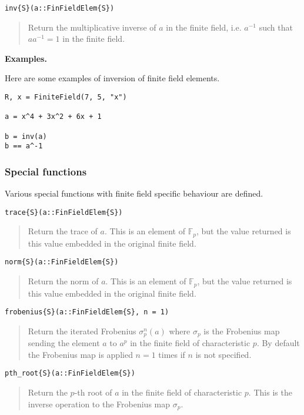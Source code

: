 \documentclass[a4paper,10pt]{article}
\newcommand{\F}{\mathbb{F}}
\newcommand{\desc}[1]{\vspace{-3mm}\begin{quote}#1\end{quote}}
\begin{document}
{{\begin{lstlisting}
inv{S}(a::FinFieldElem{S})
\end{lstlisting}

\desc{Return the multiplicative inverse of $a$ in the finite field, i.e. 
$a^{-1}$ such that $aa^{-1} = 1$ in the finite field.}

\textbf{Examples.}

Here are some examples of inversion of finite field elements.

\begin{lstlisting}
R, x = FiniteField(7, 5, "x")

a = x^4 + 3x^2 + 6x + 1

b = inv(a)
b == a^-1
\end{lstlisting}

\subsubsection{Special functions}

Various special functions with finite field specific behaviour are
defined.

\begin{lstlisting}
trace{S}(a::FinFieldElem{S})
\end{lstlisting}

\desc{Return the trace of $a$. This is an element of $\F_p$, but the value
returned is this value embedded in the original finite field.}

\begin{lstlisting}
norm{S}(a::FinFieldElem{S})
\end{lstlisting}

\desc{Return the norm of $a$. This is an element of $\F_p$, but the value
returned is this value embedded in the original finite field.}

\begin{lstlisting}
frobenius{S}(a::FinFieldElem{S}, n = 1)
\end{lstlisting}

\desc{Return the iterated Frobenius $\sigma_p^n(a)$ where $\sigma_p$ is the 
Frobenius map sending the element $a$ to $a^p$ in the finite field of 
characteristic $p$. By default the Frobenius map is applied $n = 1$ times if
$n$ is not specified.}

\begin{lstlisting}
pth_root{S}(a::FinFieldElem{S})
\end{lstlisting}

\desc{Return the $p$-th root of $a$ in the finite field of characteristic
$p$. This is the inverse operation to the Frobenius map $\sigma_p$.}

}}
\end{document}
